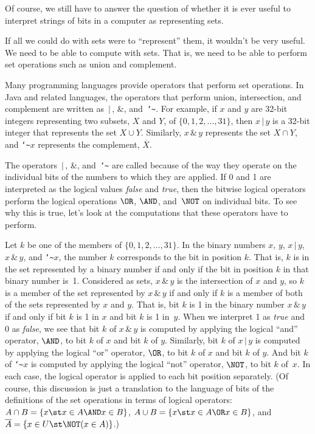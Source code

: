 Of course, we still have to answer the question of whether it
is ever useful to interpret strings of bits in a computer as
representing sets.

\medbreak

If all we could do with sets were to ``represent'' them, it wouldn't
be very useful.  We need to be able to compute with sets.  That
is, we need to be able to perform set operations such as 
union and complement.

Many programming languages provide operators that perform set
operations.  In Java and related languages, the operators
that perform union, intersection, and complement are written
as $\,|\,$, $\&$, and~\texttt{\char`\~}.  For example, 
if $x$ and $y$ are 32-bit integers representing two subsets,
$X$ and $Y$, of $\{0,1,2,\dots,31\}$, then
$x\,|\,y$ is a 32-bit integer that represents the set $X\cup Y$.
Similarly, $x\,\&\,y$ represents the set $X\cap Y$, and
\texttt{\char`\~}$x$ represents the complement,
$\overline{X}$.

The operators $\,|\,$, \&, and~\texttt{\char`\~}
are called 
because of the way they operate on the individual bits of the numbers
to which they are applied.  If 0 and 1 are interpreted as the
logical values \textit{false} and \textit{true}, then the
bitwise logical operators perform the logical operations
$\OR$, $\AND$, and~$\NOT$ on individual bits.  To see why this
is true, let's look at the computations that these operators
have to perform.

Let $k$ be one of the members of $\{0,1,2,\dots,31\}$.  In the
binary numbers $x$, $y$, $x\,|\,y$, $x\,\&\,y$, and \texttt{\char`\~}$x$,
the number $k$ corresponds to the bit in position $k$.  That is,
$k$ is in the set represented by a binary number if and only if the
bit in position $k$ in that binary number is~1.
Considered as sets, $x\,\&\,y$ is the intersection of $x$ and $y$,
so $k$ is a member of the set represented by $x\,\&\,y$ if and only if 
$k$ is a member of both of the sets represented by $x$ and $y$.
That is, bit $k$ is 1 in the binary number $x\,\&\,y$ if and only if bit
$k$ is 1 in $x$ and bit $k$ is 1 in~$y$.  When we interpret
1 as \textit{true} and 0 as \textit{false}, we see that
bit $k$ of $x\,\&\,y$ is computed by applying the logical ``and''
operator, $\AND$,  to bit $k$ of $x$ and bit $k$ of $y$.
Similarly, bit $k$ of $x\,|\,y$ is computed by applying the
logical ``or'' operator, $\OR$, to bit $k$ of $x$ and bit $k$ of $y$.
And bit $k$ of \texttt{\char`\~}$x$ is computed by applying the
logical ``not'' operator, $\NOT$, to bit $k$ of~$x$.  In each
case, the logical operator is applied to each bit position
separately.  (Of course, this discussion is just a translation
to the language of bits of the definitions of the set
operations in terms of logical operators:  
$A\cap B=\{x\st x\in A \AND x\in B\}$,
$A\cup B=\{x\st x\in A \OR x\in B\}$, and
$\overline{A}=\{x\in U\st \NOT(x\in A)\}$.)

